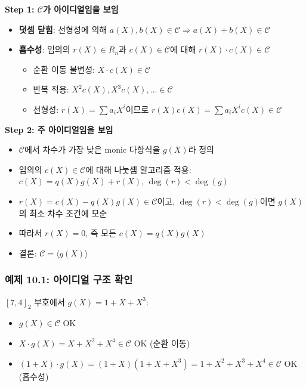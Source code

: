\documentclass[
  oneside]{article}
\providecommand{\tightlist}{%
  \setlength{\itemsep}{0pt}\setlength{\parskip}{0pt}}
\begin{document}
\textbf{Step 1: \(\mathcal{C}\)가 아이디얼임을 보임}

\begin{itemize}
\tightlist
\item
  \textbf{덧셈 닫힘}: 선형성에 의해
  \(a(X), b(X) \in \mathcal{C} \Rightarrow a(X) + b(X) \in \mathcal{C}\)
\item
  \textbf{흡수성}: 임의의 \(r(X) \in R_n\)과 \(c(X) \in \mathcal{C}\)에
  대해 \(r(X) \cdot c(X) \in \mathcal{C}\)

  \begin{itemize}
  \tightlist
  \item
    순환 이동 불변성: \(X \cdot c(X) \in \mathcal{C}\)
  \item
    반복 적용: \(X^2 c(X), X^3 c(X), \dots \in \mathcal{C}\)
  \item
    선형성: \(r(X) = \sum a_i X^i\)이므로
    \(r(X)c(X) = \sum a_i X^i c(X) \in \mathcal{C}\)
  \end{itemize}
\end{itemize}

\textbf{Step 2: 주 아이디얼임을 보임}

\begin{itemize}
\tightlist
\item
  \(\mathcal{C}\)에서 차수가 가장 낮은 monic 다항식을 \(g(X)\)라 정의
\item
  임의의 \(c(X) \in \mathcal{C}\)에 대해 나눗셈 알고리즘 적용:
  \(c(X) = q(X)g(X) + r(X)\), \(\deg(r) < \deg(g)\)
\item
  \(r(X) = c(X) - q(X)g(X) \in \mathcal{C}\)이고,
  \(\deg(r) < \deg(g)\)이면 \(g(X)\)의 최소 차수 조건에 모순
\item
  따라서 \(r(X) = 0\), 즉 모든 \(c(X) = q(X)g(X)\)
\item
  결론: \(\mathcal{C} = \langle g(X) \rangle\)
\end{itemize}

\subsubsection{예제 10.1: 아이디얼 구조
확인}\label{uxc608uxc81c-10.1-uxc544uxc774uxb514uxc5bc-uxad6cuxc870-uxd655uxc778}

\([7, 4]_2\) 부호에서 \(g(X) = 1 + X + X^3\):

\begin{itemize}
\tightlist
\item
  \(g(X) \in \mathcal{C}\) OK
\item
  \(X \cdot g(X) = X + X^2 + X^4 \in \mathcal{C}\) OK (순환 이동)
\item
  \((1 + X) \cdot g(X) = (1 + X)(1 + X + X^3) = 1 + X^2 + X^3 + X^4 \in \mathcal{C}\)
  OK (흡수성)
\end{itemize}
\end{document}
